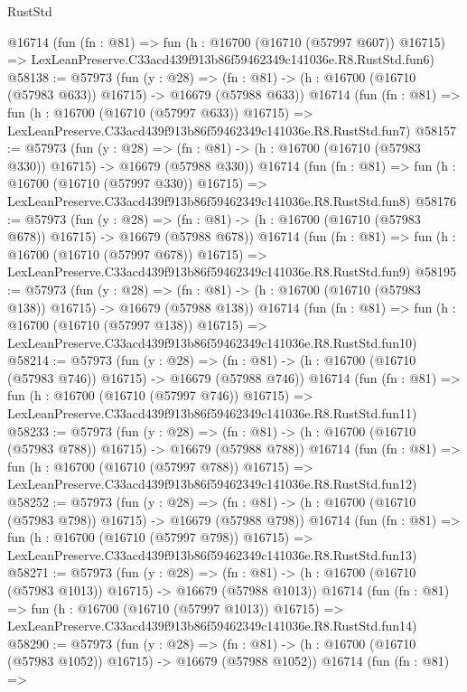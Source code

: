 \begin{lexlean}{RustStd}
\begin{coremodule}
    @16714
    (fun (fn : @81) =>
    fun (h : @16700 (@16710 (@57997 @607)) @16715) =>
    LexLeanPreserve.C33acd439f913b86f59462349c141036e.R8.RustStd.fun6)
@58138 := @57973
    (fun (y : @28) =>
    (fn : @81) -> (h : @16700 (@16710 (@57983 @633)) @16715) -> @16679 (@57988 @633))
    @16714
    (fun (fn : @81) =>
    fun (h : @16700 (@16710 (@57997 @633)) @16715) =>
    LexLeanPreserve.C33acd439f913b86f59462349c141036e.R8.RustStd.fun7)
@58157 := @57973
    (fun (y : @28) =>
    (fn : @81) -> (h : @16700 (@16710 (@57983 @330)) @16715) -> @16679 (@57988 @330))
    @16714
    (fun (fn : @81) =>
    fun (h : @16700 (@16710 (@57997 @330)) @16715) =>
    LexLeanPreserve.C33acd439f913b86f59462349c141036e.R8.RustStd.fun8)
@58176 := @57973
    (fun (y : @28) =>
    (fn : @81) -> (h : @16700 (@16710 (@57983 @678)) @16715) -> @16679 (@57988 @678))
    @16714
    (fun (fn : @81) =>
    fun (h : @16700 (@16710 (@57997 @678)) @16715) =>
    LexLeanPreserve.C33acd439f913b86f59462349c141036e.R8.RustStd.fun9)
@58195 := @57973
    (fun (y : @28) =>
    (fn : @81) -> (h : @16700 (@16710 (@57983 @138)) @16715) -> @16679 (@57988 @138))
    @16714
    (fun (fn : @81) =>
    fun (h : @16700 (@16710 (@57997 @138)) @16715) =>
    LexLeanPreserve.C33acd439f913b86f59462349c141036e.R8.RustStd.fun10)
@58214 := @57973
    (fun (y : @28) =>
    (fn : @81) -> (h : @16700 (@16710 (@57983 @746)) @16715) -> @16679 (@57988 @746))
    @16714
    (fun (fn : @81) =>
    fun (h : @16700 (@16710 (@57997 @746)) @16715) =>
    LexLeanPreserve.C33acd439f913b86f59462349c141036e.R8.RustStd.fun11)
@58233 := @57973
    (fun (y : @28) =>
    (fn : @81) -> (h : @16700 (@16710 (@57983 @788)) @16715) -> @16679 (@57988 @788))
    @16714
    (fun (fn : @81) =>
    fun (h : @16700 (@16710 (@57997 @788)) @16715) =>
    LexLeanPreserve.C33acd439f913b86f59462349c141036e.R8.RustStd.fun12)
@58252 := @57973
    (fun (y : @28) =>
    (fn : @81) -> (h : @16700 (@16710 (@57983 @798)) @16715) -> @16679 (@57988 @798))
    @16714
    (fun (fn : @81) =>
    fun (h : @16700 (@16710 (@57997 @798)) @16715) =>
    LexLeanPreserve.C33acd439f913b86f59462349c141036e.R8.RustStd.fun13)
@58271 := @57973
    (fun (y : @28) =>
    (fn : @81) -> (h : @16700 (@16710 (@57983 @1013)) @16715) -> @16679 (@57988 @1013))
    @16714
    (fun (fn : @81) =>
    fun (h : @16700 (@16710 (@57997 @1013)) @16715) =>
    LexLeanPreserve.C33acd439f913b86f59462349c141036e.R8.RustStd.fun14)
@58290 := @57973
    (fun (y : @28) =>
    (fn : @81) -> (h : @16700 (@16710 (@57983 @1052)) @16715) -> @16679 (@57988 @1052))
    @16714
    (fun (fn : @81) =>

\end{coremodule}
\end{lexlean}
